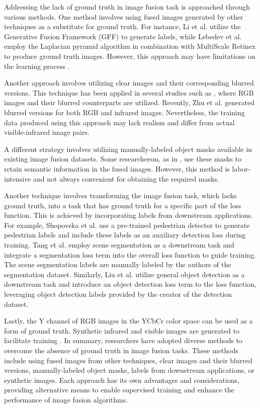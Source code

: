 Addressing the lack of ground truth in image fusion task is approached through various methods. One method involves using fused images generated by other techniques as a substitute for ground truth. For instance, Li et al. \cite{li2019coupled} utilize the Generative Fusion Framework (GFF) \cite{li2013image} to generate labels, while Lebedev et al.\cite{lebedev2019multisensor} employ the Laplacian pyramid algorithm in combination with MultiScale Retinex \cite{petro2014multiscale} to produce ground truth images. However, this approach may have limitations on the learning process \cite{ma2020ganmcc}.

Another approach involves utilizing clear images and their corresponding blurred versions. This technique has been applied in several studies such as \cite{zhang2020ifcnn,liu2018infrared, wang2019generative, feng2020fully, luo2021ifsepr}, where RGB images and their blurred counterparts are utilized. Recently, Zhu et al. \cite{zhu2022iplf} generated blurred versions for both RGB and infrared images. Nevertheless, the training data produced using this approach may lack realism and differ from actual visible-infrared image pairs.

A different strategy involves utilizing manually-labeled object masks available in existing image fusion datasets. Some researchersm, as in \cite{ma2021stdfusionnet}, use these masks to retain semantic information in the fused images. However, this method is labor-intensive and not always convenient for obtaining the required masks.

Another technique involves transforming the image fusion task, which lacks ground truth, into a task that has ground truth for a specific part of the loss function. This is achieved by incorporating labels from downstream applications. For example, Shopovska et al. \cite{shopovska2019deep} use a pre-trained pedestrian detector to generate pedestrian labels and include these labels as an auxiliary detection loss during training. Tang et al. \cite{tang2022image} employ scene segmentation as a downstream task and integrate a segmentation loss term into the overall loss function to guide training. The scene segmentation labels are manually labeled by the authors of the segmentation dataset. Similarly, Liu et al. \cite{liu2022target} utilize general object detection as a downstream task and introduce an object detection loss term to the loss function, leveraging object detection labels provided by the creator of the detection dataset.

Lastly, the Y channel of RGB images in the YCbCr color space can be used as a form of ground truth. Synthetic infrared and visible images are generated to facilitate training \cite{luo2021latraivf}. In summary, researchers have adopted diverse methods to overcome the absence of ground truth in image fusion tasks. These methods include using fused images from other techniques, clear images and their blurred versions, manually-labeled object masks, labels from downstream applications, or synthetic images. Each approach has its own advantages and considerations, providing alternative means to enable supervised training and enhance the performance of image fusion algorithms.
